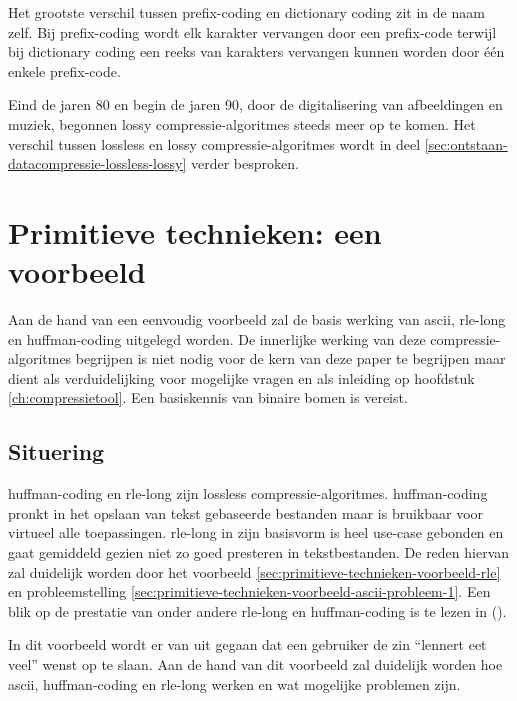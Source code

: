 Het grootste verschil tussen \gls{prefix-coding} en dictionary coding zit in de naam zelf. Bij \gls{prefix-coding} wordt elk karakter vervangen door een \gls{prefix-code} terwijl bij dictionary coding een reeks van karakters vervangen kunnen worden door één enkele \gls{prefix-code}.  

Eind de jaren 80 en begin de jaren 90, door de digitalisering van afbeeldingen en muziek, begonnen \gls{lossy} \glspl{compressie-algoritme} steeds meer op te komen. Het verschil tussen \gls{lossless} en \gls{lossy} \glspl{compressie-algoritme} wordt in deel \ref{sec:ontstaan-datacompressie-lossless-lossy} verder besproken.


\section{Primitieve technieken: een voorbeeld}
\label{sec:primitieve-technieken-voorbeeld}
Aan de hand van een eenvoudig voorbeeld zal de basis werking van \gls{ascii}, \gls{rle-long} en \gls{huffman-coding} uitgelegd worden. De innerlijke werking van deze \glspl{compressie-algoritme} begrijpen is niet nodig voor de kern van deze paper te begrijpen maar dient als verduidelijking voor mogelijke vragen en als inleiding op hoofdstuk \ref{ch:compressietool}. Een basiskennis van binaire bomen is vereist.

\subsection{Situering}
\label{sec:primitieve-technieken-voorbeeld-situering}
\Gls{huffman-coding} en \gls{rle-long} zijn \gls{lossless} \glspl{compressie-algoritme}. \Gls{huffman-coding} pronkt in het opslaan van tekst gebaseerde bestanden maar is bruikbaar voor virtueel alle toepassingen. \Gls{rle-long} in zijn basisvorm is heel \gls{use-case} gebonden en gaat gemiddeld gezien niet zo goed presteren in tekstbestanden. De reden hiervan zal duidelijk worden door het voorbeeld \ref{sec:primitieve-technieken-voorbeeld-rle} en probleemstelling \ref{sec:primitieve-technieken-voorbeeld-ascii-probleem-1}. Een blik op de prestatie van onder andere \gls{rle-long} en \gls{huffman-coding} is te lezen in  (\cite{losslessfortextdata}).

In dit voorbeeld wordt er van uit gegaan dat een gebruiker de zin “lennert eet veel” wenst op te slaan. Aan de hand van dit voorbeeld zal duidelijk worden hoe \gls{ascii}, \gls{huffman-coding} en \gls{rle-long} werken en wat mogelijke problemen zijn.

